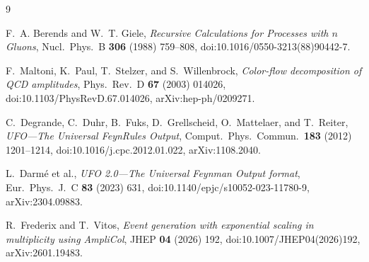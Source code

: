 \documentclass[10pt,letterpaper]{article}
\begin{document}
\clearpage
\begin{thebibliography}{9}

F.~A. Berends and W.~T. Giele,
\emph{Recursive Calculations for Processes with \(n\) Gluons},
Nucl.\ Phys.\ B \textbf{306} (1988) 759--808,
doi:10.1016/0550-3213(88)90442-7.

F.~Maltoni, K.~Paul, T.~Stelzer, and S.~Willenbrock,
\emph{Color-flow decomposition of QCD amplitudes},
Phys.\ Rev.\ D \textbf{67} (2003) 014026,
doi:10.1103/PhysRevD.67.014026,
arXiv:hep-ph/0209271.

C.~Degrande, C.~Duhr, B.~Fuks, D.~Grellscheid, O.~Mattelaer, and T.~Reiter,
\emph{UFO---The Universal FeynRules Output},
Comput.\ Phys.\ Commun.\ \textbf{183} (2012) 1201--1214,
doi:10.1016/j.cpc.2012.01.022,
arXiv:1108.2040.

L.~Darm\'e et al.,
\emph{UFO 2.0---The Universal Feynman Output format},
Eur.\ Phys.\ J.\ C \textbf{83} (2023) 631,
doi:10.1140/epjc/s10052-023-11780-9,
arXiv:2304.09883.

R.~Frederix and T.~Vitos,
\emph{Event generation with exponential scaling in multiplicity using
AmpliCol},
JHEP \textbf{04} (2026) 192,
doi:10.1007/JHEP04(2026)192,
arXiv:2601.19483.

\end{thebibliography}
\end{document}
